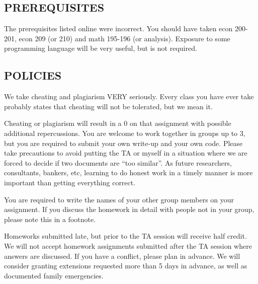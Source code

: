 \documentclass{scrartcl}
\begin{document}
\subsection*{PREREQUISITES}
The prerequisites listed online were incorrect. You should have taken econ 200-201, econ 209 (or 210) and math 195-196 (or analysis). Exposure to some programming language will be very useful, but is not required. 

\subsection*{POLICIES}

We take cheating and plagiarism VERY seriously. Every class you have ever take probably states that cheating will not be tolerated, but we mean it. %

Cheating or plagiarism will result in a 0 on that assignment with possible additional repercussions. You are welcome to work together in groups up to 3, but you are required to submit your own write-up and your own code. Please take precautions to avoid putting the TA or myself in a situation where we are forced to decide if two documents are ``too similar''. As future researchers, consultants, bankers, etc, learning to do honest work in a timely manner is more important than getting everything correct. 

You are required to write the names of your other group members on your assignment. If you discuss the homework in detail with people not in your group, please note this in a footnote.

Homeworks submitted late, but prior to the TA session will receive half credit. We will not accept homework assignments submitted after the TA session where answers are discussed. If you have a conflict, please plan in advance. We will consider granting extensions requested more than 5 days in advance, as well as documented family emergencies.
\end{document}
